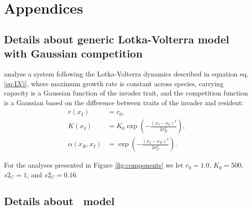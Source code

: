 \documentclass[a4paper,11pt]{article}
\begin{document}



\clearpage
\setcounter{secnumdepth}{2}

\section{Appendices}

\subsection{Details about generic Lotka-Volterra model with
Gaussian competition}\label{sec:DD99}

\citet{Dieckmann-1999} analyse a system following the Lotka-Volterra dynamics described in equation eq. \ref{eq:LVi}, where maximum growth rate is constant across species, carrying capacity is a Gaussian function of the invader trait, and the competition function is a Gaussian based on the difference between traits of the invader and resident:
\begin{subequations}
\begin{align}
\label{eq:DD}
r(x_I) &= r_0, \\
K(x_I) &= K_0 \exp\left(-\frac{\left(x_I-x_0\right)^2}{2\sigma^2_K}\right),\\
\alpha(x_R, x_I) &= \exp\left(-\frac{\left(x_I-x_R\right)^2}{2\sigma^2_C}\right).
\end{align}
\end{subequations}

For the analyses presented in Figure \ref{fig:components} we let $r_0=1.0$, $K_0=500$,
 $s2_C=1$, and $s2_C=0.16$.

\subsection{Details about \Rstar\ model}\label{sec:Rstar}
\end{document}
